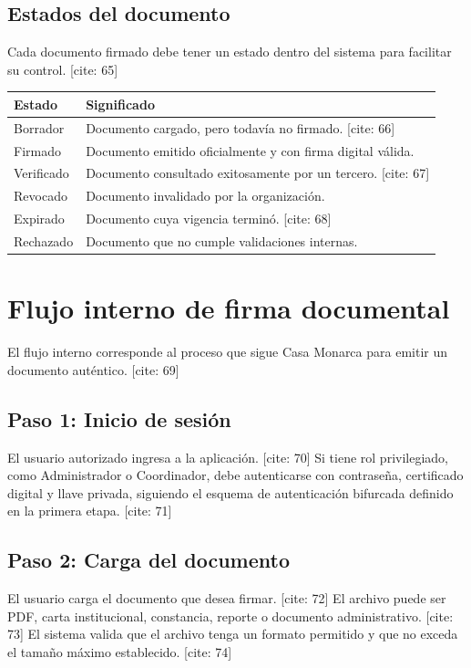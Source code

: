 \documentclass[10pt]{article} [cite: 1]
\begin{document}
\subsection{Estados del documento}

Cada documento firmado debe tener un estado dentro del sistema para facilitar su control. [cite: 65]
\begin{longtable}{p{3.5cm}p{10.5cm}}
\toprule
\textbf{Estado} & \textbf{Significado} \\
\midrule
Borrador & Documento cargado, pero todavía no firmado. [cite: 66] \\
Firmado & Documento emitido oficialmente y con firma digital válida. \\
Verificado & Documento consultado exitosamente por un tercero. [cite: 67] \\
Revocado & Documento invalidado por la organización. \\
Expirado & Documento cuya vigencia terminó. [cite: 68] \\
Rechazado & Documento que no cumple validaciones internas. \\
\bottomrule
\end{longtable}

\section{Flujo interno de firma documental}

El flujo interno corresponde al proceso que sigue Casa Monarca para emitir un documento auténtico. [cite: 69]

\subsection{Paso 1: Inicio de sesión}

El usuario autorizado ingresa a la aplicación. [cite: 70] Si tiene rol privilegiado, como Administrador o Coordinador, debe autenticarse con contraseña, certificado digital y llave privada, siguiendo el esquema de autenticación bifurcada definido en la primera etapa. [cite: 71]

\subsection{Paso 2: Carga del documento}

El usuario carga el documento que desea firmar. [cite: 72] El archivo puede ser PDF, carta institucional, constancia, reporte o documento administrativo. [cite: 73] El sistema valida que el archivo tenga un formato permitido y que no exceda el tamaño máximo establecido. [cite: 74]
\end{document}
